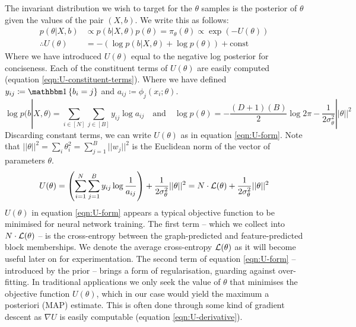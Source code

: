 The invariant distribution we wish to target for the $\theta$ samples is the posterior of $\theta$ given the values of the pair $(X, b)$. We write this as follows:
%
\begin{align}
	p(\theta | X, b) &\propto p(b | X, \theta) p(\theta) = \pi_\theta (\theta) \propto  \exp \left( - U(\theta) \right) \\
	\therefore U(\theta) &= - \left( \log p(b | X, \theta) + \log p(\theta) \right) + \textrm{const}
\end{align}
%
Where we have introduced $U(\theta)$ equal to the negative log posterior for conciseness. Each of the constituent terms of $U(\theta)$ are easily computed (equation \ref{eqn:U-constituent-terms}). Where we have defined $y_{ij} \coloneqq \one \left\{ b_i = j \right\}$ and $a_{ij} \coloneqq \phi_j(x_i; \theta)$.
%
\begin{equation}
	\log p(b | X, \theta) = \sum_{i \in [N]} \sum_{j \in [B]} y_{ij} \log a_{ij}  \quad \textrm{and} \quad
	\log p(\theta) = -\frac{(D+1)(B)}{2} \log 2\pi - \frac{1}{2 \sigma_\theta^2} || \theta ||^2
	\label{eqn:U-constituent-terms}
\end{equation}
%
Discarding constant terms, we can write $U(\theta)$ as in equation \ref{eqn:U-form}. Note that $||\theta||^2 = \sum_{i} \theta_{i}^2 = \sum_{j=1}^{B} ||w_j||^2$ is the Euclidean norm of the vector of parameters $\theta$.
%
\begin{equation}
	U(\theta) = \left( \sum_{i=1}^{N} \sum_{j=1}^{B} y_{ij} \log \frac{1}{a_{ij}} \right)
	+ \frac{1}{2\sigma_\theta^2} ||\theta||^2 = N \cdot \mathcal{L}(\theta) + \frac{1}{2\sigma_\theta^2} ||\theta||^2
	\label{eqn:U-form}
\end{equation}
%
$U(\theta)$ in equation \ref{eqn:U-form} appears a typical objective function to be minimised for neural network training. The first term -- which we collect into $N \cdot \mathcal{L}(\theta)$ -- is the cross-entropy between the graph-predicted and feature-predicted block memberships. We denote the average cross-entropy $\mathcal{L}(\theta)$ as it will become useful later on for experimentation. The second term of equation \ref{eqn:U-form} -- introduced by the prior -- brings a form of regularisation, guarding against over-fitting. In traditional applications we only seek the value of $\theta$ that minimises the objective function $U(\theta)$, which in our case would yield the maximum a posteriori (MAP) estimate. This is often done through some kind of gradient descent as $\nabla U$ is easily computable (equation \ref{eqn:U-derivative}).

